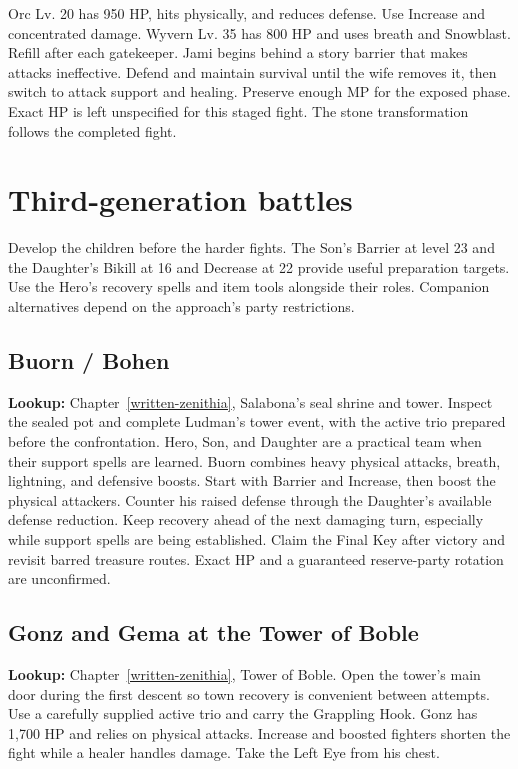 Orc Lv. 20 has 950 HP, hits physically, and reduces defense. Use Increase and concentrated damage. Wyvern Lv. 35 has 800 HP and uses breath and Snowblast. Refill after each gatekeeper. Jami begins behind a story barrier that makes attacks ineffective. Defend and maintain survival until the wife removes it, then switch to attack support and healing. Preserve enough MP for the exposed phase. Exact HP is left unspecified for this staged fight. The stone transformation follows the completed fight.

\section{Third-generation battles}
Develop the children before the harder fights. The Son's Barrier at level 23 and the Daughter's Bikill at 16 and Decrease at 22 provide useful preparation targets. Use the Hero's recovery spells and item tools alongside their roles. Companion alternatives depend on the approach's party restrictions.

\subsection{Buorn / Bohen}
\textbf{Lookup:} Chapter~\ref{written-zenithia}, Salabona's seal shrine and tower. Inspect the sealed pot and complete Ludman's tower event, with the active trio prepared before the confrontation. Hero, Son, and Daughter are a practical team when their support spells are learned. Buorn combines heavy physical attacks, breath, lightning, and defensive boosts. Start with Barrier and Increase, then boost the physical attackers. Counter his raised defense through the Daughter's available defense reduction. Keep recovery ahead of the next damaging turn, especially while support spells are being established. Claim the Final Key after victory and revisit barred treasure routes. Exact HP and a guaranteed reserve-party rotation are unconfirmed.

\subsection{Gonz and Gema at the Tower of Boble}
\textbf{Lookup:} Chapter~\ref{written-zenithia}, Tower of Boble. Open the tower's main door during the first descent so town recovery is convenient between attempts. Use a carefully supplied active trio and carry the Grappling Hook. Gonz has 1,700 HP and relies on physical attacks. Increase and boosted fighters shorten the fight while a healer handles damage. Take the Left Eye from his chest.

